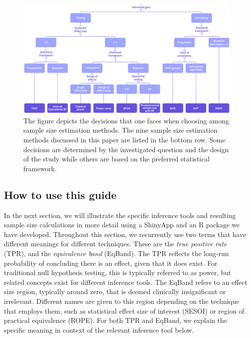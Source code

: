 \documentclass[
  english,
  man,floatsintext]{apa6}
\begin{document}
\begin{figure}

{\centering \includegraphics[width=1\linewidth]{./flowchart} 

}

\caption{The figure depicts the decisions that one faces when choosing among sample size estimation methods. The nine sample size estimation methods discussed in this paper are listed in the bottom row. Some decisions are determined by the investigated question and the design of the study while others are based on the preferred statistical framework.}\label{fig:flowchart}
\end{figure}



\hypertarget{how-to-use-this-guide}{%
\subsection{How to use this guide}\label{how-to-use-this-guide}}

In the next section, we will illustrate the specific inference tools and resulting sample size calculations in more detail using a ShinyApp and an R package we have developed. Throughout this section, we recurrently use two terms that have different meanings for different techniques. These are the \emph{true positive rate} (TPR), and the \emph{equivalence band} (EqBand). The TPR reflects the long-run probability of concluding there is an effect, given that it does exist. For traditional null hypothesis testing, this is typically referred to as power, but related concepts exist for different inference tools. The EqBand refers to an effect size region, typically around zero, that is deemed clinically insignificant or irrelevant. Different names are given to this region depending on the technique that employs them, such as statistical effect size of interest (SESOI) or region of practical equivalence (ROPE). For both TPR and EqBand, we explain the specific meaning in context of the relevant inference tool below.
\end{document}
